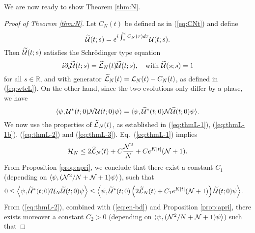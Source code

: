 \documentclass[11pt,a4paper]{article}
\newcommand{\ech}[2]{#2}	%
\newcommand{\cU}{{\cal U}}
\newcommand{\bR}{{\mathbb R}}
\newcommand{\wt}{\widetilde}
\newcommand{\cH}{{\cal H}}
\newcommand{\cL}{{\cal L}}
\newcommand{\cN}{{\cal N}}
\begin{document}
%
%
\iffalse
We are now ready to show Theorem \ref{thm:N}.
\begin{proof}[Proof of Theorem \ref{thm:N}]
Let $C_N (t)$ be defined as in (\ref{eq:CNt}) and define
\[ \wt{\cU} (t;s) = e^{i \int_s^t C_N (\tau) d\tau} \cU (t;s). \]
Then $\wt{\cU} (t;s)$ satisfies the Schr\"odinger type equation
\[ i\partial_t \wt{\cU} (t;s) = \wt{\cL}_N (t) \wt{\cU} (t;s), \quad \text{with } \wt{\cU} (s;s) = 1 \]
for all $s \in \bR$, and with generator $\wt{\cL}_N (t) = \cL_N (t) - C_N (t)$, as defined in (\ref{eq:wtcL}). On the other hand, since the two evolutions only differ by a phase, we have
\[ \langle \psi , \cU^* (t;0) \cN \cU (t;0) \psi \rangle = \langle \psi , \wt{\cU}^* (t;0) \cN \wt{\cU} (t;0) \psi \rangle. \]
We now use the properties of $\wt{\cL}_N(t)$, as established in (\ref{eq:thmL-1}), (\ref{eq:thmL-1b}), (\ref{eq:thmL-2}) and (\ref{eq:thmL-3}).\ech{To this end, we observe that, by the assumption $\varphi \in H^4 (\bR^3)$ and by Proposition \ref{t:pdes}, there exist constants $C,K > 0$ such that \begin{equation}\label{eq:varphi-bds}  \| \varphi_t^{(N)} \|_{H^4}^2 , \left(\| \varphi_t^{(N)} \|_{H^4} \| \varphi_t^{(N)} \|_{H^2} + \| \varphi_t^{(N)} \|_{H^2}^3 \right) \leq C e^{K |t|} \end{equation}
uniformly in $N$, and for all $t \in \bR$.}{} Eq.\ (\ref{eq:thmL-1}) implies \ech{therefore}{} 
\begin{equation}\label{eq:en-bd} \cH_N \leq 2 \wt{\cL}_N (t) + C \frac{\cN^2}{N} + C e^{K |t|} (\cN + 1). \end{equation}
{F}rom Proposition \ref{prop:apri}, we conclude that there exist a constant $C_1$ (depending on $\langle \psi , (\cN^2/ N + \cN + 1) \psi \rangle$\ech{and on the constant $C$ in (\ref{eq:varphi-bds})}{}), such that
\begin{equation}\label{eq:grw-1} \begin{split} 
0 \leq \Big\langle \psi , \wt{\cU}^* (t;0) &\cH_N \wt{\cU} (t;0) \psi \Big\rangle \leq \left\langle \psi , \wt{\cU}^* (t;0) \left( 2 \wt{\cL}_N (t) + C_1 e^{K|t|} (\cN + 1) \right) \wt{\cU} (t;0) \psi \right\rangle. \end{split} \end{equation}
{F}rom (\ref{eq:thmL-2}), combined with (\ref{eq:en-bd}) and Proposition \ref{prop:apri}, there exists moreover a constant $C_2 > 0$ (depending on $\langle \psi , (\cN^2/ N + \cN + 1) \psi \rangle$\ech{ and on the constant $C$ in (\ref{eq:varphi-bds})}{}) such that

\end{proof}
\end{document}

